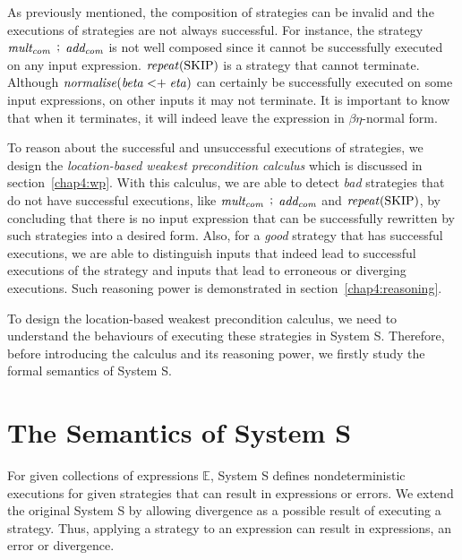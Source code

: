 As previously mentioned, the composition of strategies can be invalid and the executions of strategies are not always successful. For instance, the strategy $\mathit{mult_{com}}\, \mathrel{\mathop;} \,\mathit{add_{com}}$ is not well composed since it cannot be successfully executed on any input expression. $\mathit{repeat}(\text{SKIP})$ is a strategy that cannot terminate. Although $\mathit{normalise}(\mathit{beta} <\mathrel{\mathop+} \mathit{eta})$ can certainly be successfully executed on some input expressions, on other inputs it may not terminate. It is important to know that when it terminates, it will indeed leave the expression in $\beta\eta$-normal form.

To reason about the successful and unsuccessful executions of strategies, we design the \emph{location-based weakest precondition calculus} which is discussed in section~\ref{chap4:wp}. With this calculus, we are able to detect \emph{bad} strategies that do not have successful executions, like $\mathit{mult_{com}}\, \mathrel{\mathop;} \,\mathit{add_{com}}$ and $\mathit{repeat}(\text{SKIP})$, by concluding that there is no input expression that can be successfully rewritten by such strategies into a desired form. Also, for a \emph{good} strategy that has successful executions, we are able to distinguish inputs that indeed lead to successful executions of the strategy and inputs that lead to erroneous or diverging executions. Such reasoning power is demonstrated in section~\ref{chap4:reasoning}.  

To design the location-based weakest precondition calculus, we need to understand the behaviours of executing these strategies in System S. Therefore, before introducing the calculus and its reasoning power, we firstly study the formal semantics of System S.

\section{The Semantics of System S}
\label{chap4:semantics}
For given collections of expressions $\mathbb{E}$, System S defines nondeterministic executions for given strategies that can result in expressions or errors. We extend the original System S by allowing divergence as a possible result of executing a strategy. Thus, applying a strategy to an expression can result in expressions, an error or divergence.

